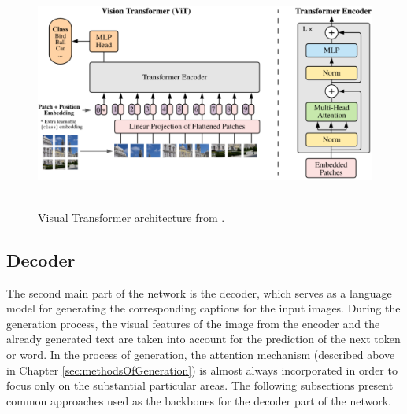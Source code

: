 \begin{figure}[h]\centering
\includegraphics[width=145mm, height=76mm]{../img/VisualTransformerArchitecture}
\caption{Visual Transformer architecture from \citet{dosovitskiy2020image}.}
\label{fig02:ViT}
\end{figure}

\subsection{Decoder}
The second main part of the network is the decoder, which serves as a language model for generating the corresponding captions for the input images. During the generation process, the visual features of the image from the encoder and the already generated text are taken into account for the prediction of the next token or word. In the process of generation, the attention mechanism (described above in Chapter \ref{sec:methodsOfGeneration}) is almost always incorporated in order to focus only on the substantial particular areas. The following subsections present common approaches used as the backbones for the decoder part of the network.

